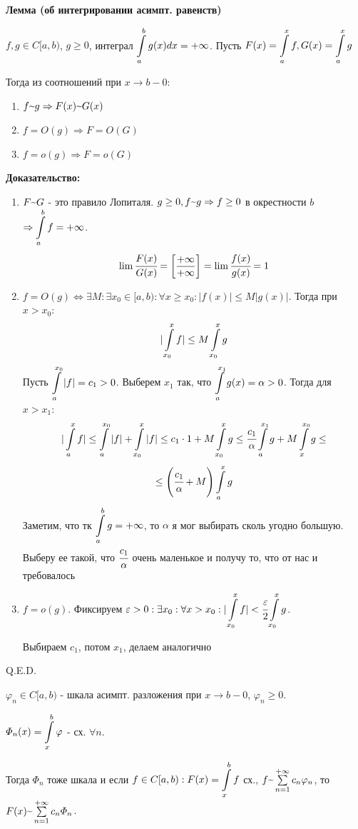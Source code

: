 \textbf{Лемма (об интегрировании асимпт. равенств)}

$f,g \in C[a,b)$, $g \geq 0$, интеграл $\displaystyle\int\limits_{a}^{b}g(x)dx = +\infty$. Пусть $F(x) = \displaystyle\int\limits_{a}^{x}f, G(x) = \displaystyle\int\limits_{a}^{x}g $

Тогда из соотношений при $x\rightarrow b-0$:
\begin{enumerate}
    \item $f \mytilde g \Rightarrow F(x) \mytilde G(x)$
    \item $f = O(g)  \Rightarrow F = O(G)$
    \item $f = o(g) \Rightarrow F = o(G)$
\end{enumerate}

\textbf{Доказательство:}
\begin{enumerate}
    \item $F \mytilde G$ - это правило Лопиталя.  $g \geq 0, f \mytilde g \Rightarrow f \geq 0$ в окрестности $b$ $\Rightarrow \displaystyle\int\limits_{a}^{b}f = +\infty$. 
    $$\lim \cfrac{F(x)}{G(x)} = \left[\frac{+\infty}{+\infty}\right] = \lim \cfrac{f(x)}{g(x)} = 1$$
    \item $f = O(g) \Leftrightarrow \exists M:\exists x_0\in [a,b):\forall x \geq x_0: |f(x)|\leq M|g(x)|$. Тогда при $x > x_0$:
    $$|\displaystyle\int\limits_{x_0}^{x}f| \leq M \displaystyle\int\limits_{x_0}^{x}g$$
    Пусть $\displaystyle\int\limits_{a}^{x_0}|f| = c_1 >0$. Выберем $x_1$ так, что $\displaystyle\int\limits_{a}^{x_1}g(x) = \alpha>0$. Тогда для $x > x_1:$
    $$|\displaystyle\int\limits_{a}^{x}f|\leq \displaystyle\int\limits_{a}^{x_0}|f| + \displaystyle\int\limits_{x_0}^{x}|f| \leq c_1 \cdot 1 + M \displaystyle\int\limits_{x_0}^{x}g \leq \cfrac{c_1}{\alpha}\displaystyle\int\limits_{a}^{x_1}g + M\displaystyle\int\limits_{x}^{x_0}g \leq$$
    $$\leq \left(\cfrac{c_1}{\alpha} + M\right) \displaystyle\int\limits_{a}^{x}g$$
    Заметим, что тк $\displaystyle\int\limits_{a}^{b}g = + \infty$, то $\alpha$ я мог выбирать сколь угодно большую. Выберу ее такой, что $\cfrac{c_1}{\alpha}$ очень маленькое и получу то, что от нас и требовалось
    \item $f = o(g)$. Фиксируем $\varepsilon > 0: \exists x_0 : \forall x>x_0: |\displaystyle\int\limits_{x_0}^{x} f| < \cfrac{\varepsilon}{2}\displaystyle\int\limits_{x_0}^{x}g$.

    Выбираем $c_1$, потом $x_1$, делаем аналогично
\end{enumerate}
\hfil Q.E.D.

 $\varphi_n \in C[a,b)$ - шкала асимпт. разложения при $x\rightarrow b-0$, $\varphi_n \geq 0$.

$\varPhi_n (x) = \displaystyle\int\limits_{x}^{b}\varphi$ - сх. $\forall n$.

Тогда $\varPhi_n$ тоже шкала и если $f \in C[a,b): F(x) = \displaystyle\int\limits_{x}^{b}f$ сх., $f \mytilde \sum\limits_{n=1}^{+\infty}c_n \varphi_n$, то $F(x) \mytilde \sum\limits_{n=1}^{+\infty}c_n \varPhi_n$.

